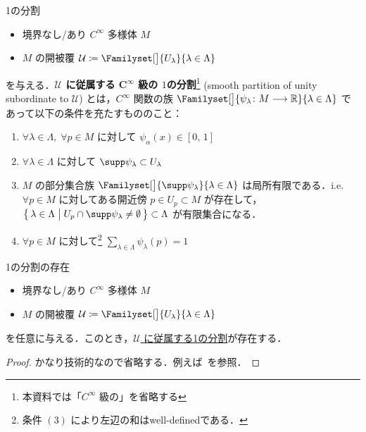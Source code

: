 \documentclass[geometry_main]{subfiles}
\begin{document}
\begin{mydef}[label=def:PoU]{1の分割}
    \begin{itemize}
        \item 境界なし/あり $C^\infty$ 多様体 $M$
        \item $M$ の開被覆 $\mathcal{U} \coloneqq \Familyset[\big]{U_\lambda}{\lambda \in \Lambda}$
    \end{itemize}
    を与える．\textbf{$\bm{\mathcal{U}}$ に従属する $\bm{C}^\infty$ 級の $1$の分割}\footnote{本資料では「$C^\infty$ 級の」を省略する} (smooth partition of unity subordinate to $\mathcal{U}$) とは，$C^\infty$ 関数の族 $\Familyset[\big]{\psi_\lambda \colon M \lto \mathbb{R}}{\lambda \in \Lambda}$ であって以下の条件を充たすもののこと：
    \begin{enumerate}
        \item $\forall \lambda \in \Lambda,\; \forall p \in M$ に対して $\psi_\alpha (x) \in [0,\, 1]$
        \item $\forall \lambda \in \Lambda$ に対して $\supp \psi_\lambda \subset U_\lambda$
        \item $M$ の部分集合族 $\Familyset[\big]{\supp \psi_\lambda}{\lambda \in \Lambda}$ は局所有限である．i.e. $\forall p \in M$ に対してある開近傍 $p \in U_p \subset M$ が存在して，$\bigl\{\, \lambda \in \Lambda \bigm| U_p \cap \supp \psi_\lambda \neq \emptyset \,\bigr\} \subset \Lambda$ が有限集合になる．
        \item $\forall p \in M$ に対して\footnote{条件 $(3)$ により左辺の和はwell-definedである．} $\sum_{\lambda \in \Lambda} \psi_\lambda(p) = 1$
    \end{enumerate}
\end{mydef}

\begin{myprop}[label=prop:PoU]{1の分割の存在}
    \begin{itemize}
        \item 境界なし/あり $C^\infty$ 多様体 $M$
        \item $M$ の開被覆 $\mathcal{U} \coloneqq \Familyset[\big]{U_\lambda}{\lambda \in \Lambda}$
    \end{itemize}
    を任意に与える．このとき，\hyperref[def:PoU]{$\mathcal{U}$ に従属する1の分割}が存在する．
\end{myprop}

\begin{proof}
    かなり技術的なので省略する．例えば~\cite[Theorem 2.23]{Lee12}を参照．
\end{proof}
\end{document}
